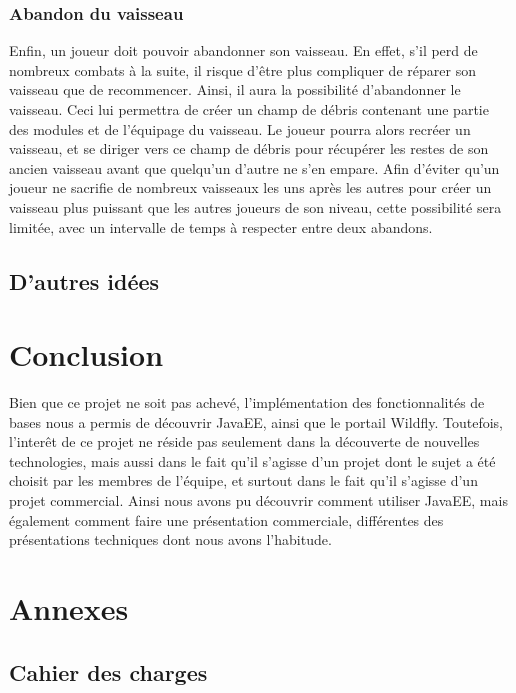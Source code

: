 \documentclass[a4paper,11pt]{report}
\begin{document}
    \subsection{Abandon du vaisseau}
      Enfin, un joueur doit pouvoir abandonner son vaisseau. 
      En effet, s'il perd de nombreux combats à la suite, il risque d'être plus compliquer de réparer son vaisseau que de recommencer.
      Ainsi, il aura la possibilité d'abandonner le vaisseau. Ceci lui permettra de créer un champ de débris contenant une partie des modules et de l'équipage du vaisseau.
      Le joueur pourra alors recréer un vaisseau, et se diriger vers ce champ de débris pour récupérer les restes de son ancien vaisseau avant que quelqu'un d'autre ne s'en empare.
      Afin d'éviter qu'un joueur ne sacrifie de nombreux vaisseaux les uns après les autres pour créer un vaisseau plus puissant que les autres joueurs de son niveau, cette possibilité sera limitée, avec un intervalle de temps à respecter entre deux abandons.
      
  \section{D'autres idées}

\chapter{Conclusion}
  Bien que ce projet ne soit pas achevé, l'implémentation des fonctionnalités de bases nous a permis de découvrir JavaEE, ainsi que le portail Wildfly.
  Toutefois, l'interêt de ce projet ne réside pas seulement dans la découverte de nouvelles technologies, mais aussi dans le fait qu'il s'agisse d'un projet dont le sujet a été choisit par les membres de l'équipe, et surtout dans le fait qu'il s'agisse d'un projet commercial.
  Ainsi nous avons pu découvrir comment utiliser JavaEE, mais également comment faire une présentation commerciale, différentes des présentations techniques dont nous avons l'habitude.

\chapter{Annexes}

  \section{Cahier des charges}
    
\end{document}
